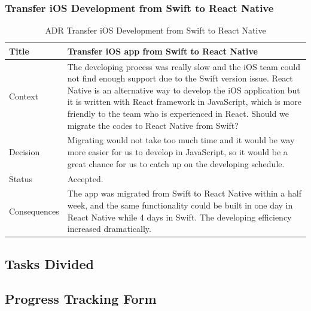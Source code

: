 \documentclass[12pt,a4paper]{article}
\begin{document}
\begin{appendices}
            \subsubsection{Transfer iOS Development from Swift to React Native}
              \begin{table}[H]
                \centering
                  \begin{tabularx}{\textwidth}{l X}
                    \hline
                    Title & Transfer iOS app from Swift to React Native \\ \hline
                    Context & The developing process was really slow and the iOS team could not find enough support due to the Swift version issue. React Native is an alternative way to develop the iOS application but it is written with React framework in JavaScript, which is more friendly to the team who is experienced in React. Should we migrate the codes to React Native from Swift? \\ 
                    Decision & Migrating would not take too much time and it would be way more easier for us to develop in JavaScript, so it would be a great chance for us to catch up on the developing schedule. \\ 
                    Status & Accepted. \\ 
                    Consequences & The app was migrated from Swift to React Native within a half week, and the same functionality could be built in one day in React Native while 4 days in Swift. The developing efficiency increased dramatically.\\                  
                    \hline
                  \end{tabularx}
                  \caption[Table caption text]{ADR Transfer iOS Development from Swift to React Native}
                  \label{table:ADR Transfer iOS Development from Swift to React Native}
              \end{table}

        \subsection{Tasks Divided}
        \subsection{Progress Tracking Form}\label{appendix:progress-tracking-form}
          
          

\end{appendices}
\end{document}
